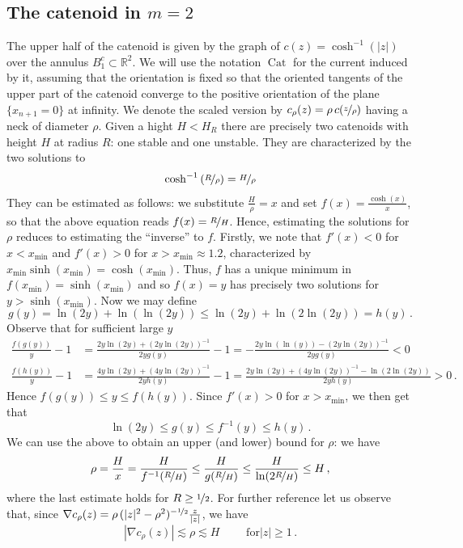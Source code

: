 \documentclass[reqno]{amsart}
\theoremstyle{definition}
\theoremstyle{remark}
\numberwithin{equation}{section}
\newcommand{\R}{\mathbb{R}}
\begin{document}
\subsection{The catenoid in $m=2$}\label{subsec.catenoid m=2}
The upper half of the catenoid is given by the graph of $c(z)=\cosh^{-1}(|z|)$ over the annulus $B_1^c\subset \R^2$. We will use the notation $\operatorname{Cat}$ for the current induced by it, assuming that the orientation is fixed so that the oriented tangents of the upper part of the catenoid converge to the positive orientation of the plane $\{x_{n+1}=0\}$ at infinity. We denote the scaled version by $c_\rho(z)= \rho\, c(\nicefrac{z}{\rho})$ %
 having a neck of diameter $\rho$. Given a hight $H<H_R$ there are precisely two catenoids with height $H$ at radius $R$: one stable and one unstable. They are characterized by the two solutions to 
\[\cosh^{-1}\left(\nicefrac{R}{\rho}\right)=\nicefrac{H}{\rho}\]
They can be estimated as follows: we substitute $\frac{H}{\rho}=x$ and set $f(x)=\frac{\cosh(x)}{x}$, so that the above equation reads $f(x)=\nicefrac{R}{H}$. Hence, estimating the solutions for $\rho$ reduces to estimating the ``inverse'' to $f$. 
Firstly, we note that $f'(x)<0$ for $x<x_{\min}$ and $f'(x)>0$ for $x>x_{\min} \approx 1.2$, characterized by $x_{\min}\sinh(x_{\min})=\cosh(x_{\min})$. Thus, $f$ has a unique minimum in $f(x_{\min})=\sinh(x_{\min})$ and so $f(x)=y$ has precisely two solutions for $y>\sinh(x_{\min})$. Now we may define 
\[ g(y)=\ln(2y)+\ln(\ln(2y))\le \ln(2y)+\ln(2\ln(2y))=h(y)\,.\]
Observe that for sufficient large $y$ 
\begin{align*}
    \frac{f(g(y))}{y}-1&= \frac{2y\ln(2y)+(2y\ln(2y))^{-1}}{2yg(y)}-1=-\frac{2y\ln(\ln(y)) - (2y\ln(2y))^{-1}}{2yg(y)}<0\\%
    \frac{f(h(y))}{y}-1&=\frac{4y\ln(2y)+(4y\ln(2y))^{-1}}{2yh(y)}-1=\frac{2y\ln(2y)+(4y\ln(2y))^{-1}-\ln(2\ln(2y))}{2yh(y)}>0\,.
\end{align*}
Hence $f(g(y))\le y\le f(h(y))$. Since $f'(x)>0$ for $x>x_{\min}$, we then get that 
\[\ln(2y) \le g(y) \le f^{-1}(y) \le h(y)\,.\]
We can use the above to obtain an upper (and lower) bound for $\rho$: we have 
\begin{equation}\label{eq.bound for rho}
    \rho= \frac{H}{x}= \frac{H}{f^{-1}(\nicefrac{R}{H})}\le \frac{H}{g(\nicefrac RH)}\le \frac{H}{\ln(2\nicefrac RH)}\le H\,,
\end{equation}
where the last estimate holds for $R\ge \nicefrac12$. For further reference let us observe that, since $\nabla c_\rho(z)= \rho\,(|z|^2-\rho^2)^{-\nicefrac12} \frac{z}{|z|}$, we have
\begin{equation}\label{eq.derivative catenoid}
    |\nabla c_\rho(z)|\lesssim \rho \lesssim H\qquad\text{ for} |z|\ge 1\,.
\end{equation}
\end{document}
